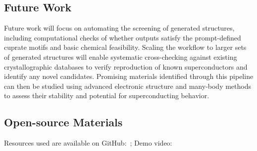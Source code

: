 \subsection*{Future Work}
Future work will focus on automating the screening of generated structures, including computational checks of whether outputs satisfy the prompt-defined cuprate motifs and basic chemical feasibility. Scaling the workflow to larger sets of generated structures will enable systematic cross-checking against existing crystallographic databases to verify reproduction of known superconductors and identify any novel candidates. Promising materials identified through this pipeline can then be studied using advanced electronic structure and many-body methods to assess their stability and potential for superconducting behavior.

\subsection*{Open-source Materials}
Resources used are available on GitHub: \,; Demo video: 







